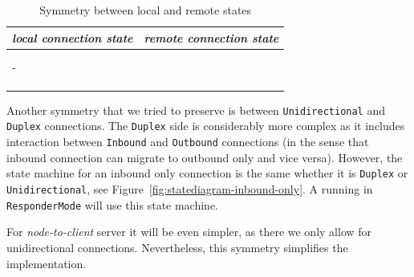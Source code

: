 \begin{table}[h]
  \begin{tabular}[h]{l|l}
    \textit{local connection state} & \textit{remote connection state} \\ [0.3em]
    \hline \\
    \UnnegotiatedStateOut{}         & \UnnegotiatedStateIn{}           \\ [0.2em]
    -                               & \InboundIdleStateAny{}           \\ [0.2em]
    \OutboundStateAny{}             & \InboundStateAny{}               \\ [0.2em]
    \InboundStateAny{}              & \OutboundStateAny{}              \\ [0.2em]
    \DuplexState{}                  & \DuplexState{}                   \\ [0.2em]
  \end{tabular}
  \caption{Symmetry between local and remote states}
  \label{table:symmetry}
\end{table}

Another symmetry that we tried to preserve is between \texttt{Unidirectional}
and \texttt{Duplex} connections. The \texttt{Duplex} side is considerably more
complex as it includes interaction between \texttt{Inbound} and
\texttt{Outbound} connections (in the sense that inbound connection can migrate
to outbound only and vice versa). However, the state machine for an inbound
only connection is the same whether it is \texttt{Duplex} or
\texttt{Unidirectional}, see Figure~\ref{fig:statediagram-inbound-only}.
A \connmngr{} running in \texttt{ResponderMode} will use this state
machine.

For \textit{node-to-client} server it will be even simpler, as there
we only allow for unidirectional connections. Nevertheless, this symmetry
simplifies the implementation.

